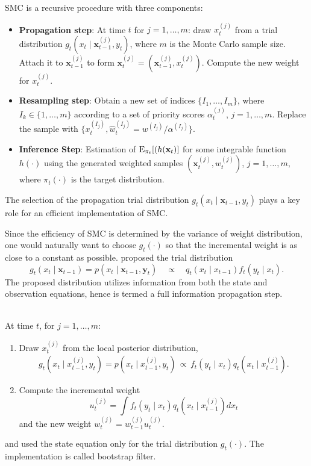 SMC is a recursive procedure with three components:
\begin{itemize}
\item {\bf Propagation step}: At time $t$ for $j=1,\ldots, m$: draw $x_t^{(j)}$ from a trial distribution $g_t(x_t \mid {\mathbf x}_{t-1}^{(j)},y_t)$, where $m$ is the Monte Carlo sample size. Attach it to ${\mathbf x}_{t-1}^{(j)}$ to form ${\mathbf x}_{t}^{(j)}=({\mathbf x}_{t-1}^{(j)}, x_t^{(j)})$. Compute the new weight for $x_{t}^{(j)}$.
\item {\bf Resampling step}: Obtain a new set of indices $\{I_1, \ldots, I_m\}$, where $I_k\in \{1, \ldots, m \}$ according to a set of priority scores $\alpha_t^{(j)}$, $j=1,\ldots, m$. Replace the sample with $\{x_t^{(I_j)}, \hat{w}_t^{(I_j)}=w^{(I_j)}/\alpha^{(I_j)}\}$.
\item {\bf Inference Step}: Estimation of ${\rm E}_{\pi_t}[(h({\mathbf x}_t)]$ for some integrable function $h(\cdot)$ using the generated weighted samples $({\mathbf x}_t^{(j)}, w_t^{(j)})$, $j=1,\ldots,m$, where $\pi_t(\cdot)$ is the target distribution. 
\end{itemize}
The selection of the propagation trial distribution $g_t(x_t\mid {\mathbf x}_{t-1},y_t)$ plays a key role
for an efficient implementation of SMC.

Since the efficiency of SMC is determined by the variance of weight distribution, one would naturally want to choose $g_t(\cdot)$ so that the incremental weight is as close to a constant as possible. \cite{LiuChen1995, LiuChen1998} proposed the trial distribution
\[
g_t(x_t\mid {\mathbf x}_{t-1})=p(x_t\mid {\mathbf x}_{t-1},{\mathbf y}_t)\quad  \propto\quad  q_t(x_t\mid x_{t-1})f_t(y_t\mid x_t).
\]
The proposed distribution utilizes information from both the state and observation equations, hence is termed a full information propagation step.

\\
At time $t$, for $j=1,\ldots,m$:
\begin{enumerate}
\item Draw $x_t^{(j)}$ from the local posterior distribution,
\begin{align*}
g_t(x_t\mid x_{t-1}^{(j)}, y_t)=p(x_t \mid x_{t-1}^{(j)},y_t)\, \propto\,  f_t(y_t\mid x_t)q_t(x_t \mid x_{t-1}^{(j)}).
\end{align*}
\item Compute the incremental weight
\[
u_t^{(j)}=\int f_t(y_t \mid x_t) q_t(x_t \mid x_{t-1}^{(j)})dx_t
\]
and the new weight $w_t^{(j)}=w_{t-1}^{(j)}u_t^{(j)}$.
\end{enumerate}
\cite{gordon1993} and \cite{kitagawa1996} used the state equation only for the trial distribution $g_t(\cdot)$. The implementation is called bootstrap filter.

